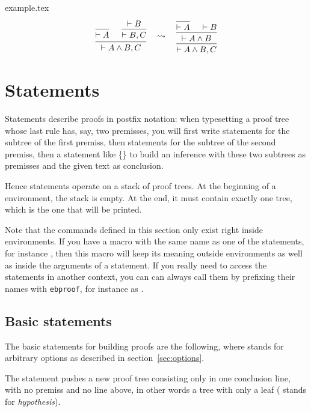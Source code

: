 \documentclass{l3doc}
\newenvironment{example}{%
  \VerbatimEnvironment
  \begin{VerbatimOut}{example.tex}}{%
  \end{VerbatimOut}
  \begin{center}
  \begin{minipage}{.4\textwidth}
    
  \end{minipage}%
  \begin{minipage}{.6\textwidth}
    \small\VerbatimInput[gobble=0]{example.tex}
  \end{minipage}%
  \end{center}
}
\begin{document}
\begin{example}
  \[
    \begin{prooftree}
      \infer0{ \vdash A }
      \hypo{ \vdash B } \infer1{ \vdash B, C }
      \infer2{ \vdash A\wedge B, C }
    \end{prooftree}
    \quad \rightsquigarrow \quad
    \begin{prooftree}
      \infer0{ \vdash A } \hypo{ \vdash B }
      \infer2{ \vdash A\wedge B }
      \infer1{ \vdash A\wedge B, C }
    \end{prooftree}
  \]
\end{example}

\section{Statements}
\label{sec:statements}

Statements describe proofs in postfix notation: when typesetting a proof tree
whose last rule has, say, two premisses, you will first write statements for
the subtree of the first premiss, then statements for the subtree of the
second premiss, then a statement like \{\} to
build an inference with these two subtrees as premisses and the given text as
conclusion.

Hence statements operate on a stack of proof trees.
At the beginning of a  environment, the stack is empty.
At the end, it must contain exactly one tree, which is the one that will be
printed.

Note that the commands defined in this section only exist right inside
 environments.
If you have a macro with the same name as one of the statements, for instance
, then this macro will keep its meaning outside 
environments as well as inside the arguments of a statement.
If you really need to access the statements in another context, you can can
always call them by prefixing their names with \texttt{ebproof}, for instance as
.

\subsection{Basic statements}

The basic statements for building proofs are the following, where
 stands for arbitrary options as described in
section~\ref{sec:options}.

\DescribeMacro{\hypo}
The statement  pushes a new proof tree consisting only in one
conclusion line, with no premiss and no line above, in other words a tree with
only a leaf ( stands for \emph{hypothesis}).
\begin{syntax}
\end{syntax}
\end{document}
